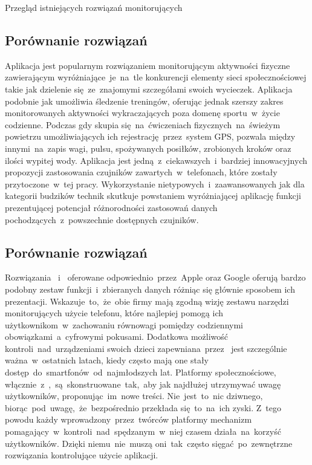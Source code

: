 \begin{chapter}{Przegląd istniejących rozwiązań monitorujących}
	\subsection{Porównanie rozwiązań}
	Aplikacja  jest popularnym rozwiązaniem monitorującym aktywności fizyczne zawierającym wyróżniające~je~na~tle konkurencji elementy sieci społecznościowej takie jak dzielenie się~ze~znajomymi szczegółami swoich wycieczek. Aplikacja  podobnie jak  umożliwia śledzenie treningów, oferując jednak szerszy zakres monitorowanych aktywności wykraczających poza domenę sportu~w~życie codzienne. Podczas gdy  skupia się~na~ćwiczeniach fizycznych~na~świeżym powietrzu umożliwiających ich rejestrację~przez~system GPS,  pozwala między innymi~na~zapis wagi, pulsu, spożywanych posiłków, zrobionych kroków oraz ilości wypitej wody. Aplikacja  jest jedną~z~ciekawszych~i~bardziej innowacyjnych propozycji zastosowania czujników zawartych~w~telefonach, które zostały przytoczone~w~tej pracy. Wykorzystanie nietypowych~i~zaawansowanych jak dla kategorii budzików technik skutkuje powstaniem wyróżniającej aplikację funkcji prezentującej potencjał różnorodności zastosowań danych pochodzących~z~powszechnie dostępnych czujników.
	
	
	
	\subsection{Porównanie rozwiązań}
	Rozwiązania ~i~ oferowane odpowiednio~przez~Apple oraz Google oferują bardzo podobny zestaw funkcji~i~zbieranych danych różniąc się głównie sposobem ich prezentacji. Wskazuje~to,~że~obie firmy mają zgodną wizję zestawu narzędzi monitorujących użycie telefonu, które najlepiej pomogą ich użytkownikom~w~zachowaniu równowagi pomiędzy codziennymi obowiązkami~a~cyfrowymi pokusami. Dodatkowa możliwość kontroli~nad~urządzeniami swoich dzieci zapewniana~przez~ jest szczególnie ważna~w~ostatnich latach, kiedy często mają one stały dostęp~do~smartfonów~od~najmłodszych lat. Platformy społecznościowe, włącznie~z~,~są~skonstruowane~tak,~aby jak najdłużej utrzymywać uwagę użytkowników, proponując~im~nowe treści. Nie~jest~to~nic dziwnego, biorąc~pod~uwagę,~że~bezpośrednio przekłada się~to~na~ich zyski. Z~tego powodu każdy wprowadzony~przez~twórców platformy  mechanizm pomagający~w~kontroli~nad~spędzanym~w~niej czasem działa~na~korzyść użytkowników. Dzięki niemu~nie~muszą oni~tak~często sięgać~po~zewnętrzne rozwiązania kontrolujące użycie aplikacji.
	
	
\end{chapter}
